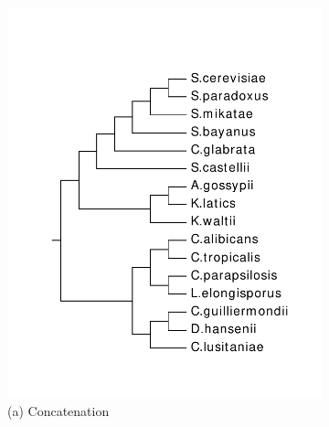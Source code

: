 \begin{figure}[!h]
	\centering
	\begin{subfigure}[t]{0.31\textwidth}
	\centering
		\includegraphics[width=\textwidth]{figures/fastmulrfs-fig3a.pdf}
		\caption{(a) Concatenation} 
	\end{subfigure}
	~
	\begin{subfigure}[t]{0.31\textwidth}
	\centering

\end{subfigure}
\end{figure}
